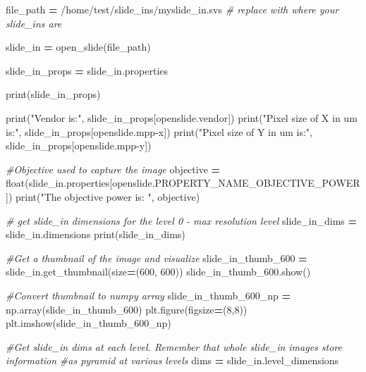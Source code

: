 \documentclass[
]{book}
\newenvironment{Shaded}{\begin{snugshade}}{\end{snugshade}}
\newcommand{\BuiltInTok}[1]{#1}
\newcommand{\CommentTok}[1]{\textcolor[rgb]{0.56,0.35,0.01}{\textit{#1}}}
\newcommand{\DecValTok}[1]{\textcolor[rgb]{0.00,0.00,0.81}{#1}}
\newcommand{\NormalTok}[1]{#1}
\newcommand{\OperatorTok}[1]{\textcolor[rgb]{0.81,0.36,0.00}{\textbf{#1}}}
\newcommand{\StringTok}[1]{\textcolor[rgb]{0.31,0.60,0.02}{#1}}
\begin{document}
\begin{Shaded}
\begin{Highlighting}[]
\NormalTok{file\_path }\OperatorTok{=} \StringTok{\textquotesingle{}/home/test/slide\_ins/myslide\_in.svs\textquotesingle{}} \CommentTok{\# replace with where your slide\_ins are}

\NormalTok{slide\_in }\OperatorTok{=}\NormalTok{ open\_slide(file\_path)}

\NormalTok{slide\_in\_props }\OperatorTok{=}\NormalTok{ slide\_in.properties}

\BuiltInTok{print}\NormalTok{(slide\_in\_props)}

\BuiltInTok{print}\NormalTok{(}\StringTok{"Vendor is:"}\NormalTok{, slide\_in\_props[}\StringTok{\textquotesingle{}openslide.vendor\textquotesingle{}}\NormalTok{])}
\BuiltInTok{print}\NormalTok{(}\StringTok{"Pixel size of X in um is:"}\NormalTok{, slide\_in\_props[}\StringTok{\textquotesingle{}openslide.mpp{-}x\textquotesingle{}}\NormalTok{])}
\BuiltInTok{print}\NormalTok{(}\StringTok{"Pixel size of Y in um is:"}\NormalTok{, slide\_in\_props[}\StringTok{\textquotesingle{}openslide.mpp{-}y\textquotesingle{}}\NormalTok{])}

\CommentTok{\#Objective used to capture the image}
\NormalTok{objective }\OperatorTok{=} \BuiltInTok{float}\NormalTok{(slide\_in.properties[openslide.PROPERTY\_NAME\_OBJECTIVE\_POWER])}
\BuiltInTok{print}\NormalTok{(}\StringTok{"The objective power is: "}\NormalTok{, objective)}

\CommentTok{\# get slide\_in dimensions for the level 0 {-} max resolution level}
\NormalTok{slide\_in\_dims }\OperatorTok{=}\NormalTok{ slide\_in.dimensions}
\BuiltInTok{print}\NormalTok{(slide\_in\_dims)}

\CommentTok{\#Get a thumbnail of the image and visualize}
\NormalTok{slide\_in\_thumb\_600 }\OperatorTok{=}\NormalTok{ slide\_in.get\_thumbnail(size}\OperatorTok{=}\NormalTok{(}\DecValTok{600}\NormalTok{, }\DecValTok{600}\NormalTok{))}
\NormalTok{slide\_in\_thumb\_600.show()}

\CommentTok{\#Convert thumbnail to numpy array}
\NormalTok{slide\_in\_thumb\_600\_np }\OperatorTok{=}\NormalTok{ np.array(slide\_in\_thumb\_600)}
\NormalTok{plt.figure(figsize}\OperatorTok{=}\NormalTok{(}\DecValTok{8}\NormalTok{,}\DecValTok{8}\NormalTok{))}
\NormalTok{plt.imshow(slide\_in\_thumb\_600\_np)    }


\CommentTok{\#Get slide\_in dims at each level. Remember that whole slide\_in images store information}
\CommentTok{\#as pyramid at various levels}
\NormalTok{dims }\OperatorTok{=}\NormalTok{ slide\_in.level\_dimensions}


\end{Highlighting}
\end{Shaded}
\end{document}
